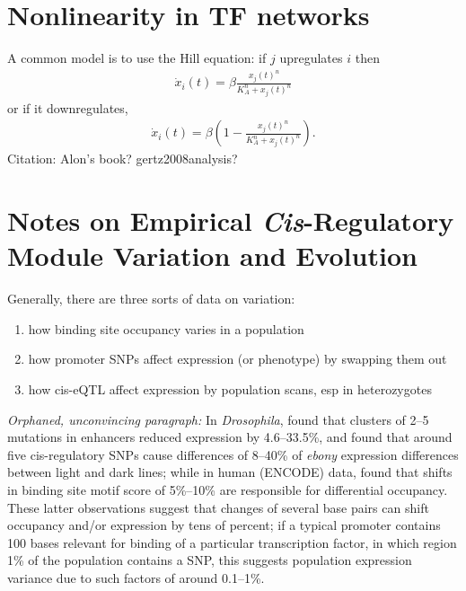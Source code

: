 \documentclass{article}
\begin{document}
\section{Nonlinearity in TF networks}

A common model is to use the Hill equation:
if $j$ upregulates $i$ then
\begin{align}
    \dot x_i(t) = \beta \frac{x_j(t)^n}{ K_A^n + x_j(t)^n}
\end{align}
or if it downregulates,
\begin{align}
    \dot x_i(t) = \beta (1-\frac{x_j(t)^n}{ K_A^n + x_j(t)^n} ).
\end{align}
Citation: Alon's book? gertz2008analysis?

\section{Notes on Empirical \emph{Cis}-Regulatory Module Variation and Evolution}

Generally, there are three sorts of data on variation:
\begin{enumerate}
    \item how binding site occupancy varies in a population
    \item how promoter SNPs affect expression (or phenotype) by swapping them out
    \item how cis-eQTL affect expression by population scans, esp in heterozygotes
\end{enumerate}


\emph{Orphaned, unconvincing paragraph:}
  In \textit{Drosophila}, \citet{frankel2011morphological} 
  found that clusters of 2--5 mutations in enhancers
  reduced expression  by 4.6--33.5\%,
  and \citet{rebeiz2009stepwise} found that around five cis-regulatory SNPs
  cause differences of 8--40\% of \textit{ebony} expression differences
  between light and dark lines;
  while in human (ENCODE) data, \citet{shi2016evaluating} found that shifts in binding site motif score
  of 5\%--10\% are responsible for differential occupancy.
  These latter observations suggest that changes of several base pairs
  can shift occupancy and/or expression by tens of percent;
  if a typical promoter contains 100 bases relevant for binding of a particular transcription factor,
  in which region 1\% of the population contains a SNP,
  this suggests population expression variance due to such factors of around 0.1--1\%.
\end{document}

